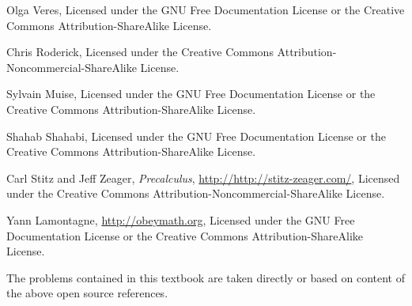\begin{thebibliography}{9}
Olga Veres,
Licensed under the GNU Free Documentation License or the
Creative Commons Attribution-ShareAlike License.

Chris Roderick,
Licensed under the
Creative Commons Attribution-Noncommercial-ShareAlike License.

Sylvain Muise,
Licensed under the GNU Free Documentation License or the
Creative Commons Attribution-ShareAlike License.

Shahab Shahabi,
Licensed under the GNU Free Documentation License or the
Creative Commons Attribution-ShareAlike License.

Carl Stitz and Jeff Zeager,
\emph{Precalculus},
\url{http://http://stitz-zeager.com/},
Licensed under the
Creative Commons Attribution-Noncommercial-ShareAlike License.

Yann Lamontagne,
\url{http://obeymath.org},
Licensed under the GNU Free Documentation License or the 
Creative Commons Attribution-ShareAlike License.

\end{thebibliography}
The problems contained in this textbook are taken directly or based on content of the above open source references.


